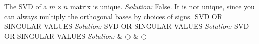 \fi     
\ifnum {} %
    The SVD of a $m\times n$ matrix is unique. 
    \ifnum {} {\color{DarkBlue} \textit{Solution:  } False. It is  not unique, since you can always multiply the orthogonal bases by choices of signs. } \fi
\fi   
\ifnum {} %
    SVD OR SINGULAR VALUES
    \ifnum {} {\color{DarkBlue} \textit{Solution:  }  } \fi
\fi     
\ifnum {} %
    SVD OR SINGULAR VALUES
    \ifnum {} {\color{DarkBlue} \textit{Solution:  }  } \fi
\fi   
\ifnum {} 
\fi     
\ifnum {} %
    SVD OR SINGULAR VALUES
    \ifnum {} {\color{DarkBlue} \textit{Solution:  }  } \fi
\fi   
& $\bigcirc$  & $\bigcirc$ \\   
